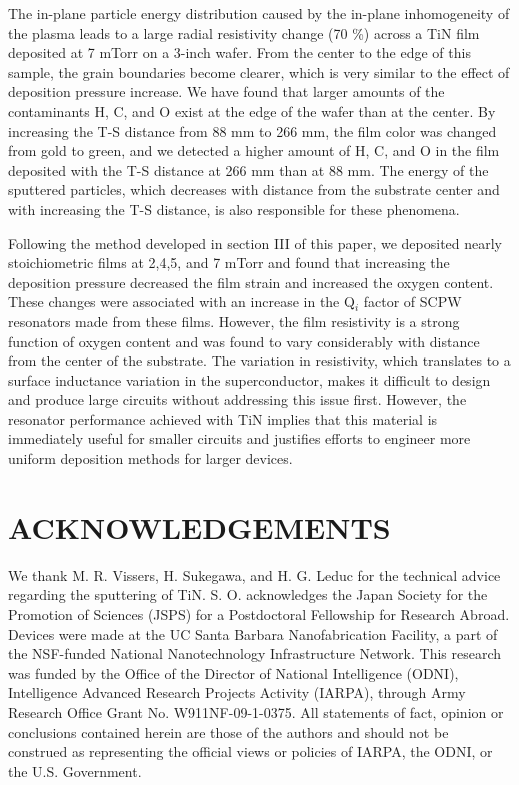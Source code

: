 The in-plane particle energy distribution caused by the in-plane inhomogeneity of the plasma leads to a large radial resistivity change (70 \%) across a TiN film deposited at 7 mTorr on a 3-inch wafer. From the center to the edge of this sample, the grain boundaries become clearer, which is very similar to the effect of deposition pressure increase. We have found that larger amounts of the contaminants H, C, and O exist at the edge of the wafer than at the center. By increasing the T-S distance from 88 mm to 266 mm, the film color was changed from gold to green, and we detected a higher amount of H, C, and O in the film deposited with the T-S distance at 266 mm than at 88 mm. The energy of the sputtered particles, which decreases with distance from the substrate center and with increasing the T-S distance, is also responsible for these phenomena.

Following the method developed in section III of this paper, we deposited nearly stoichiometric films at 2,4,5, and 7 mTorr and found that increasing the deposition pressure decreased the film strain and increased the oxygen content.  These changes were associated with an increase in the Q$_{i}$ factor of SCPW resonators made from these films.  However, the film resistivity is a strong function of oxygen content and was found to vary considerably with distance from the center of the substrate.  The variation in resistivity, which translates to a surface inductance variation in the superconductor, makes it difficult to design and produce large circuits without addressing this issue first.  However, the resonator performance achieved with TiN implies that this material is immediately useful for smaller circuits and justifies efforts to engineer more uniform deposition methods for larger devices.

\section*{ACKNOWLEDGEMENTS}%

We thank M. R. Vissers, H. Sukegawa, and H. G. Leduc for the technical advice regarding the sputtering of TiN. S. O. acknowledges the Japan Society for the Promotion of Sciences (JSPS) for a Postdoctoral Fellowship for Research Abroad.  Devices were made at the UC Santa Barbara Nanofabrication Facility, a part of the NSF-funded National Nanotechnology Infrastructure Network. This research was funded by the Office of the Director of National Intelligence (ODNI), Intelligence Advanced Research Projects Activity (IARPA), through Army Research Office Grant No. W911NF-09-1-0375. All statements of fact, opinion or conclusions contained herein are those of the authors and should not be construed as representing the official views or policies of IARPA, the ODNI, or the U.S. Government.


%